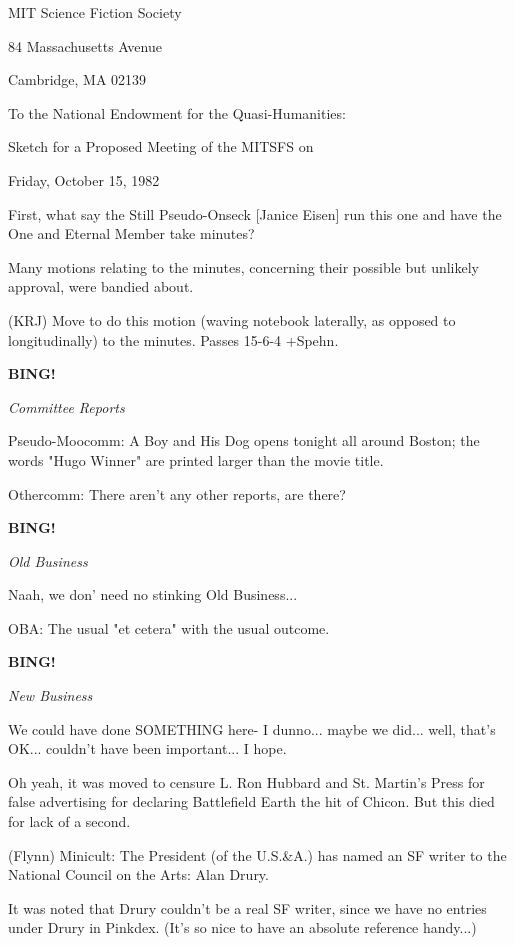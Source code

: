 \documentclass[12pt]{article}
\newcommand{\bing}{{\bf BING!} }
\newcommand{\goto}[1]{\bing \vskip 12pt \centerline{{\em{#1}}}}
\begin{document}
\begin{center}

MIT Science Fiction Society 

84 Massachusetts Avenue

Cambridge, MA 02139

\vspace{12pt}

To the National Endowment for the Quasi-Humanities:

Sketch for a Proposed Meeting of the MITSFS on

Friday, October 15, 1982

\end{center}
 
\vspace{18pt}

\setlength{\parskip}{6pt}

\noindent
First, what say the Still Pseudo-Onseck [Janice Eisen] run this one and have the One and Eternal Member take minutes?

Many motions relating to the minutes, concerning their possible but unlikely approval, were bandied about.

(KRJ) Move to do this motion (waving notebook laterally, as opposed to longitudinally) to the minutes. Passes 15-6-4 +Spehn.

\goto{Committee Reports}

Pseudo-Moocomm: A Boy and His Dog opens tonight all around Boston; the words "Hugo Winner" are printed larger than the movie title.

Othercomm: There aren't any other reports, are there?

\goto{Old Business}

Naah, we don' need no stinking Old Business...

OBA: The usual "et cetera" with the usual outcome.

\goto{New Business}

We could have done SOMETHING here- I dunno... maybe we did... well, that's OK... couldn't have been important... I hope.

Oh yeah, it was moved to censure L. Ron Hubbard and St. Martin's Press for false advertising for declaring Battlefield Earth the hit of Chicon. But this died for lack of a second.

(Flynn) Minicult: The President (of the U.S.&A.) has named an SF writer to the National Council on the Arts: Alan Drury.

It was noted that Drury couldn't be a real SF writer, since we have no entries under Drury in Pinkdex. (It's so nice to have an absolute reference handy...)
\end{document}
